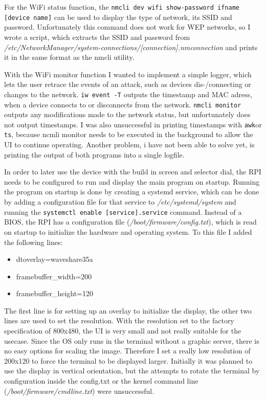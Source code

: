 For the WiFi status function, the \lstinline[]|nmcli dev wifi show-password ifname [device name]| can be used to display the type of network, its SSID and password.
Unfortunately this command does not work for WEP networks, so I wrote a script, which extracts the SSID and password from \textit{/etc/NetworkManager/system-connections/[connection].nmconnection} and prints it in the same format as the nmcli utility.

With the WiFi monitor function I wanted to implement a simple logger, which lets the user retrace the events of an attack, such as devices dis-/connecting or changes to the network.
\newline\lstinline[]|iw event -T| outputs the timestamp and MAC adress, when a device connects to or disconnects from the network. 
\newline\lstinline[]|nmcli monitor| outputs any modifications made to the network status, but unfortunately does not output timestamps.
I was also unsuccessful in printing timestamps with \lstinline[]|awk|or \lstinline[]|ts|, because ncmli monitor needs to be executed in the background to allow the UI to continue operating.
Another problem, i have not been able to solve yet, is printing the output of both programs into a single logfile.

In order to later use the device with the build in screen and selector dial, the RPI needs to be configured to run and display the main program on startup.
Running the program on startup is done by creating a systemd service, which can be done by adding a configuration file for that service to \textit{/etc/systemd/system} and running the \lstinline[]|systemctl enable [service].service| command.
Instead of a BIOS, the RPI has a configuration file (\textit{/boot/firmware/config.txt}), which is read on startup to initialize the hardware and operating system.
To this file I added the following lines:

\begin{itemize}[\null]
    \item dtoverlay=waveshare35a
    \item framebuffer\_width=200
    \item framebuffer\_height=120 
\end{itemize}

The first line is for setting up an overlay to initialize the display, the other two lines are used to set the resolution.
With the resolution set to the factory specification of 800x480, the UI is very small and not really suitable for the usecase.
Since the OS only runs in the terminal without a graphic server, there is no easy options for scaling the image.
Therefore I set a really low resolution of 200x120 to force the terminal to be displayed larger.
Initially it was planned to use the display in vertical orientation, but the attempts to rotate the terminal by configuration inside the config.txt or the kernel command line (\textit{/boot/firmware/cmdline.txt}) were unsuccessful.

